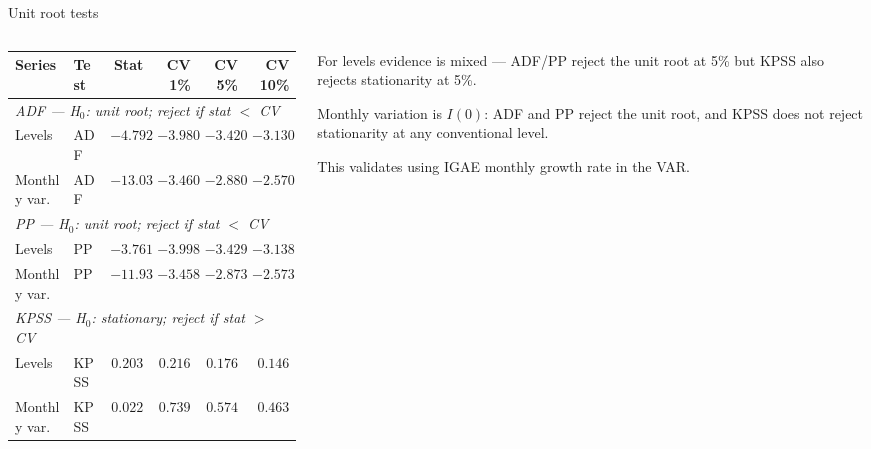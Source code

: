 \documentclass[handout,aspectratio=169,11pt,xcolor={dvipsnames},hyperref={pdftex,pdfpagemode=UseNone,hidelinks,pdfdisplaydoctitle=true},usepdftitle=false]{beamer}
\begin{document}
\begin{frame}{Unit root tests}
\begin{columns}[T]
\begin{column}{0.62\textwidth}
\small
\begin{tabular}{llrrrr}
\hline
\textbf{Series} & \textbf{Test} & \textbf{Stat} & \textbf{CV 1\%} & \textbf{CV 5\%} & \textbf{CV 10\%} \\
\hline
\multicolumn{6}{l}{\textit{ADF — H$_0$: unit root; reject if stat $<$ CV}} \\
\hline
Levels           & ADF &  $-4.792$ & $-3.980$ & $-3.420$ & $-3.130$ \\
Monthly var.     & ADF & $-13.030$ & $-3.460$ & $-2.880$ & $-2.570$ \\
\hline
\multicolumn{6}{l}{\textit{PP — H$_0$: unit root; reject if stat $<$ CV}} \\
\hline
Levels           & PP  &  $-3.761$ & $-3.998$ & $-3.429$ & $-3.138$ \\
Monthly var.     & PP  & $-11.934$ & $-3.458$ & $-2.873$ & $-2.573$ \\
\hline
\multicolumn{6}{l}{\textit{KPSS — H$_0$: stationary; reject if stat $>$ CV}} \\
\hline
Levels           & KPSS &  $0.203$ &  $0.216$ &  $0.176$ &  $0.146$ \\
Monthly var.     & KPSS &  $0.022$ &  $0.739$ &  $0.574$ &  $0.463$ \\
\hline
\end{tabular}
\end{column}

\begin{column}{0.35\textwidth}


For levels evidence is mixed — ADF/PP reject the unit root at 5\% but KPSS also rejects stationarity at 5\%.

\vspace{2mm}


Monthly variation is $I(0)$: ADF and PP reject the unit root, and KPSS does not reject stationarity at any conventional level.


\vspace{2mm}

This validates using IGAE monthly growth rate in the VAR.

\end{column}
\end{columns}
\end{frame}
\end{document}
